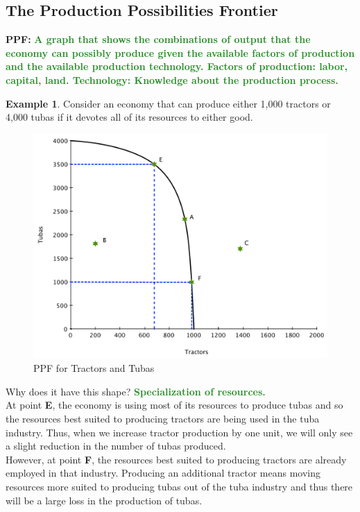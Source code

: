 \documentclass[11pt]{article}\usepackage[]{graphicx}\usepackage[]{color}
\theoremstyle{definition}
\newtheorem{exmp}{Example}[section]
\newcommand{\ddp}[1]{{\textbf{\textcolor{ForestGreen}{#1}}}}
\newcommand{\defn}[1]{\textbf{#1}}
\begin{document}
	\subsection{The Production Possibilities Frontier}
	
	\defn{PPF:} \ddp{A graph that shows the combinations of output that the economy can possibly produce given the available factors of production and the available production technology. Factors of production: labor, capital, land. Technology: Knowledge about the production process.}
	
	\begin{exmp} Consider an economy that can produce either 1,000 tractors or 4,000 tubas if it devotes all of its resources to either good.

	\begin{figure}[H]
			\centering
			\includegraphics[scale=.40]{plot1.pdf}
			\caption{PPF for Tractors and Tubas}
			\label{ppf1}
		\end{figure}
	Why does it have this shape? \ddp{Specialization of resources.}
	\\
	
	At point \textbf{E}, the economy is using most of its resources to produce tubas and so the resources best suited to producing tractors are being used in the tuba industry. Thus, when we increase tractor production by one unit, we will only see a slight reduction in the number of tubas produced. 
	\\
	
	However, at point \textbf{F}, the resources best suited to producing tractors are already employed in that industry. Producing an additional tractor means moving resources more suited to producing tubas out of the tuba industry and thus there will be a large loss in the production of tubas.
	\\
	

\end{exmp}
\end{document}
